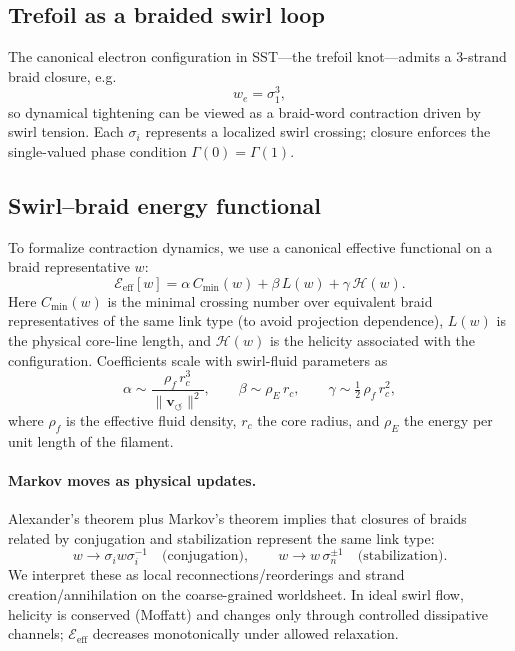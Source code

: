 \documentclass[10pt,reprint,aps,onecolumn,nofootinbib]{revtex4-2}
\begin{document}
        \subsection*{Trefoil as a braided swirl loop}
            The canonical electron configuration in SST—the trefoil knot—admits a 3-strand braid closure, e.g.
            \[
                w_e = \sigma_1^3,
            \]
            so dynamical tightening can be viewed as a braid-word contraction driven by swirl tension. Each \(\sigma_i\) represents a localized swirl crossing; closure enforces the single-valued phase condition \(\Gamma(0)=\Gamma(1)\).

        \subsection*{Swirl–braid energy functional}
            To formalize contraction dynamics, we use a canonical effective functional on a braid representative \(w\):
            \begin{equation}\label{eq:Eeff-braid}
                \mathcal{E}_{\mathrm{eff}}[w] = \alpha\,C_{\min}(w) + \beta\,L(w) + \gamma\,\mathcal{H}(w).
            \end{equation}
            Here \(C_{\min}(w)\) is the minimal crossing number over equivalent braid representatives of the same link type (to avoid projection dependence), \(L(w)\) is the physical core-line length, and \(\mathcal{H}(w)\) is the helicity associated with the configuration. Coefficients scale with swirl-fluid parameters as
            \[
                \alpha \sim \frac{\rho_f\, r_c^3}{\|\mathbf{v}_{\!\boldsymbol{\circlearrowleft}}\|^{2}},\qquad
                \beta \sim \rho_E\, r_c,\qquad
                \gamma \sim \tfrac12\,\rho_f\, r_c^2,
            \]
            where \(\rho_f\) is the effective fluid density, \(r_c\) the core radius, and \(\rho_E\) the energy per unit length of the filament.

        \paragraph*{Markov moves as physical updates.}
            Alexander’s theorem plus Markov’s theorem implies that closures of braids related by conjugation and stabilization represent the same link type:
            \[
                w \to \sigma_i w \sigma_i^{-1}\quad\text{(conjugation)},\qquad
                w \to w\,\sigma_{n}^{\pm 1}\quad\text{(stabilization)}.
            \]
            We interpret these as local reconnections/reorderings and strand creation/annihilation on the coarse-grained worldsheet. In ideal swirl flow, helicity is conserved (Moffatt) and changes only through controlled dissipative channels; \(\mathcal{E}_{\mathrm{eff}}\) decreases monotonically under allowed relaxation.
\end{document}
